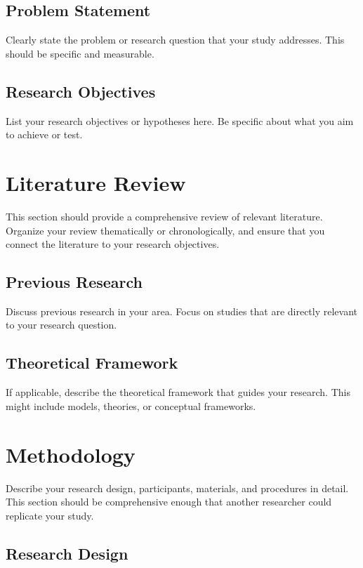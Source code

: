 \documentclass[12pt,letterpaper]{article}
\begin{document}
\subsection{Problem Statement}

Clearly state the problem or research question that your study addresses. This should be specific and measurable.

\subsection{Research Objectives}

List your research objectives or hypotheses here. Be specific about what you aim to achieve or test.

\section{Literature Review}

This section should provide a comprehensive review of relevant literature. Organize your review thematically or chronologically, and ensure that you connect the literature to your research objectives.

\subsection{Previous Research}

Discuss previous research in your area. Focus on studies that are directly relevant to your research question.

\subsection{Theoretical Framework}

If applicable, describe the theoretical framework that guides your research. This might include models, theories, or conceptual frameworks.

\section{Methodology}

Describe your research design, participants, materials, and procedures in detail. This section should be comprehensive enough that another researcher could replicate your study.

\subsection{Research Design}
\end{document}

